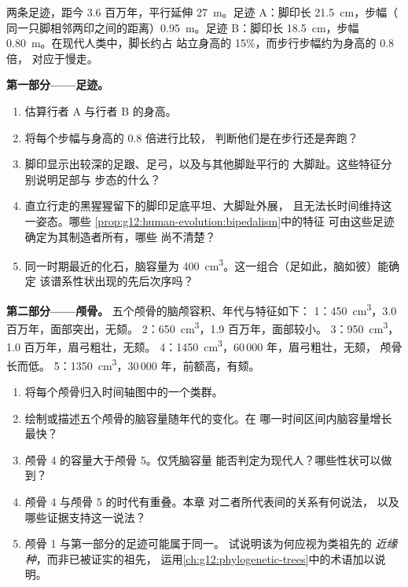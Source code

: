 \begin{problem}
\label{pb:g12:human-evolution:1}
两条足迹，距今 3.6 百万年，平行延伸
\qty{27}{m}。足迹 A：脚印长 \qty{21.5}{cm}，步幅（
同一只脚相邻两印之间的距离）\qty{0.95}{m}。足迹 B：脚印长
\qty{18.5}{cm}，步幅 \qty{0.80}{m}。在现代人类中，脚长约占
站立身高的 15\%，而步行步幅约为身高的 0.8 倍，
对应于慢走。

\medskip
\noindent\textbf{第一部分——足迹。}
\begin{enumerate}
  \item 估算行者 A 与行者 B 的身高。
       \item 将每个步幅与身高的 0.8 倍进行比较，
        判断他们是在步行还是奔跑？
  \item 脚印显示出较深的足跟、足弓，以及与其他脚趾平行的
        大脚趾。这些特征分别说明足部与
        步态的什么？
  \item 直立行走的黑猩猩留下的脚印足底平坦、大脚趾外展，
        且无法长时间维持这一姿态。哪些
        \cref{prop:g12:human-evolution:bipedalism}中的特征
        可由这些足迹确定为其制造者所有，哪些
        尚不清楚？
  \item 同一时期最近的化石，脑容量为
        \qty{400}{cm^3}。这一组合（足如此，脑如彼）能确定
        该谱系性状出现的先后次序吗？
\end{enumerate}

\medskip
\noindent\textbf{第二部分——颅骨。}
五个颅骨的脑颅容积、年代与特征如下：
1：\qty{450}{cm^3}，3.0 百万年，面部突出，无颏。
2：\qty{650}{cm^3}，1.9 百万年，面部较小。
3：\qty{950}{cm^3}，1.0 百万年，眉弓粗壮，无颏。
4：\qty{1450}{cm^3}，60\,000 年，眉弓粗壮，无颏，
颅骨长而低。
5：\qty{1350}{cm^3}，30\,000 年，前额高，有颏。
\begin{enumerate}[resume]
  \item 将每个颅骨归入时间轴图中的一个类群。
  \item 绘制或描述五个颅骨的脑容量随年代的变化。在
        哪一时间区间内脑容量增长最快？
  \item 颅骨 4 的容量大于颅骨 5。仅凭脑容量
        能否判定为现代人？哪些性状可以做到？
  \item 颅骨 4 与颅骨 5 的时代有重叠。本章
        对二者所代表间的关系有何说法，
        以及哪些证据支持这一说法？
  \item 颅骨 1 与第一部分的足迹可能属于同一。
        试说明该为何应视为类祖先的
        \emph{近缘种}，而非已被证实的祖先，
        运用\cref{ch:g12:phylogenetic-trees}中的术语加以说明。
\end{enumerate}


\end{problem}
